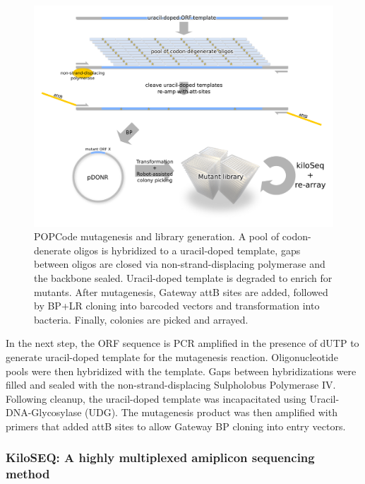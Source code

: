 
\begin{figure}[h!]
	\centering
	\includegraphics[width=\textwidth]{img/popcode_schema.pdf}%
	\caption{POPCode mutagenesis and library generation. A pool of codon-denerate oligos is hybridized to a uracil-doped template, gaps between oligos are closed via non-strand-displacing polymerase and the backbone sealed. Uracil-doped template is degraded to enrich for mutants. After mutagenesis, Gateway attB sites are added, followed by BP+LR cloning into barcoded vectors and transformation into bacteria. Finally, colonies are picked and arrayed.}
	\label{fig:popcode_schema}
\end{figure}


In the next step, the ORF sequence is PCR amplified in the presence of dUTP to generate uracil-doped template for the mutagenesis reaction. Oligonucleotide pools were then hybridized with the template. Gaps between hybridizations were filled and sealed with the non-strand-displacing Sulpholobus Polymerase IV. Following cleanup, the uracil-doped template was incapacitated using Uracil-DNA-Glycosylase (UDG). The mutagenesis product was then amplified with primers that added attB sites to allow Gateway BP cloning into entry vectors.

\subsubsection{KiloSEQ: A highly multiplexed amiplicon sequencing method}

